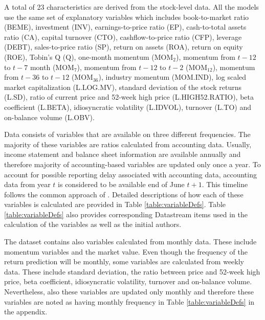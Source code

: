 \documentclass[12pt]{article}
\begin{document}
A total of 23 characteristics are derived from the stock-level data. All the models use the same set of explanatory variables which includes book-to-market ratio (BEME), investment (INV), earnings-to-price ratio (EP), cash-to-total assets ratio (CA), capital turnover (CTO), cashflow-to-price ratio (CFP), leverage (DEBT), sales-to-price ratio (SP), return on assets (ROA), return on equity (ROE), Tobin's Q (Q), one-month momentum (MOM$_2$), momentum from $t-12$ to $t-7$ month (MOM$_7$), momentum from $t-12$ to $t-2$ (MOM$_{12}$), momentum from $t-36$ to $t-12$ (MOM$_{36}$), industry momentum (MOM.IND), log scaled market capitalization (L.LOG.MV), standard deviation of the stock returns (L.SD), ratio of current price and 52-week high price (L.HIGH52.RATIO), beta coefficient (L.BETA), idiosyncratic volatility (L.IDVOL), turnover (L.TO) and on-balance volume (L.OBV). \par

Data consists of variables that are available on three different frequencies. The majority of these variables are ratios calculated from accounting data.  Usually, income statement and balance sheet information are available annually and therefore majority of accounting-based variables are updated only once a year. To account for possible reporting delay associated with accounting data, accounting data from year $t$ is considered to be available end of June $t+1$. This timeline follows the common approach of \citet{FAMA19933}.\footnotemark {} Detailed descriptions of how each of these variables is calculated are provided in Table \ref{table:variableDefs}. Table \ref{table:variableDefs} also provides corresponding Datastream items used in the calculation of the variables as well as the initial authors. 

The dataset contains also variables calculated from monthly data. These include momentum variables and the market value. Even though the frequency of the return prediction will be monthly, some variables are calculated from weekly data. These include standard deviation, the ratio between price and 52-week high price, beta coefficient, idiosyncratic volatility, turnover and on-balance volume. Nevertheless, also these variables are updated only monthly and therefore these variables are noted as having monthly frequency in Table \ref{table:variableDefs} in the appendix. \par
\end{document}
